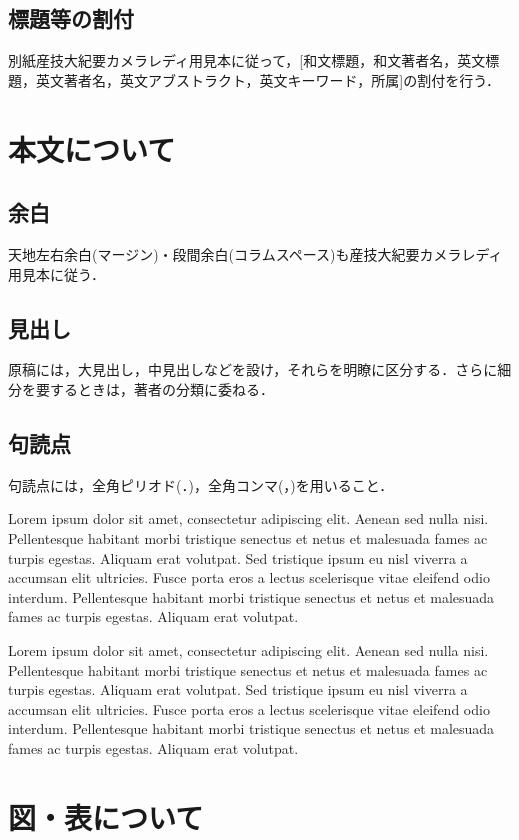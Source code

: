 \documentclass[a4j,9pt,twoside,twocolumn]{jsarticle}
\begin{document}
\subsection{標題等の割付}
別紙産技大紀要カメラレディ用見本に従って，[和文標題，和文著者名，英文標
題，英文著者名，英文アブストラクト，英文キーワード，所属]の割付を行う．

\section{本文について}

\subsection{余白}
天地左右余白(マージン)・段間余白(コラムスペース)も産技大紀要カメラレディ用見本に従う．

\subsection{見出し}
原稿には，大見出し，中見出しなどを設け，それらを明瞭に区分する．さらに細分を要するときは，著者の分類に委ねる．

\subsection{句読点}
句読点には，全角ピリオド(．)，全角コンマ(，)を用いること．

Lorem ipsum dolor sit amet, consectetur adipiscing elit. Aenean sed
nulla nisi. Pellentesque habitant morbi tristique senectus et netus et malesuada
fames ac turpis egestas. Aliquam erat volutpat. Sed tristique ipsum eu nisl
viverra a accumsan elit ultricies. Fusce porta eros a lectus scelerisque vitae
eleifend odio interdum. Pellentesque habitant morbi tristique senectus et netus
et malesuada fames ac turpis egestas. Aliquam erat volutpat.

Lorem ipsum dolor sit amet, consectetur adipiscing elit. Aenean sed
nulla nisi. Pellentesque habitant morbi tristique senectus et netus et malesuada
fames ac turpis egestas. Aliquam erat volutpat. Sed tristique ipsum eu nisl
viverra a accumsan elit ultricies. Fusce porta eros a lectus scelerisque vitae
eleifend odio interdum. Pellentesque habitant morbi tristique senectus et netus
et malesuada fames ac turpis egestas. Aliquam erat volutpat.

\section{図・表について}
\end{document}
